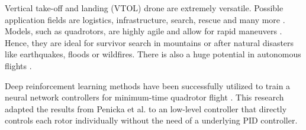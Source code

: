 Vertical take-off and landing (VTOL) drone are extremely versatile. Possible application fields are logistics, infrastructure, search, rescue and many more \cite{Drone_Applications}. Models, such as quadrotors, are highly agile and allow for rapid maneuvers \cite{Maneuverability_Agility_Art, Maneuverability_Agility_Exp}. Hence, they are ideal for survivor search in mountains or after natural disasters like earthquakes, floods or wildfires. There is also a huge potential in autonomous flights \cite{Autonomic_Flights}. 


Deep reinforcement learning methods have been successfully utilized to train a neural network controllers for minimum-time quadrotor flight \cite{Penicka_2022}. This research adapted the results from Penicka et al. to an low-level controller that directly controls each rotor individually without the need of a underlying PID controller.